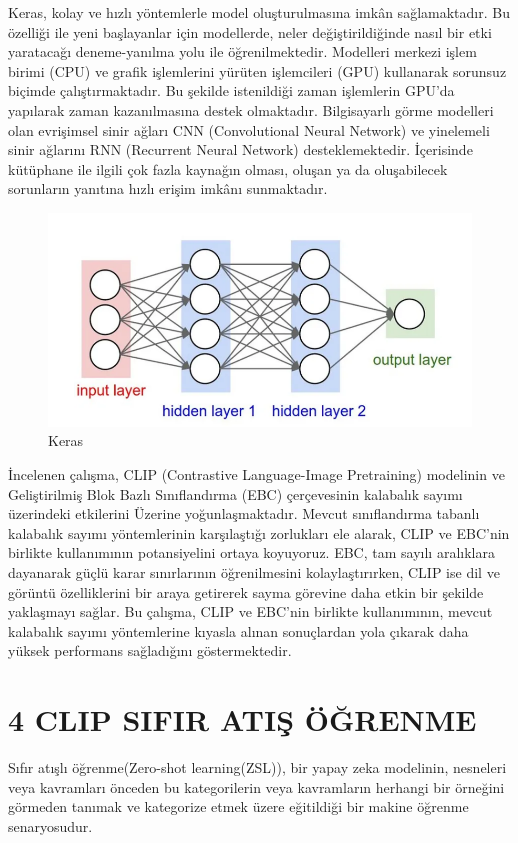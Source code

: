 \documentclass[10pt,a4paper]{report}
\begin{document}
	Keras, kolay ve hızlı yöntemlerle model oluşturulmasına imkân sağlamaktadır. Bu özelliği ile yeni başlayanlar için modellerde, neler değiştirildiğinde nasıl bir etki yaratacağı deneme-yanılma yolu ile öğrenilmektedir.
	Modelleri merkezi işlem birimi (CPU) ve grafik işlemlerini yürüten işlemcileri (GPU) kullanarak sorunsuz biçimde çalıştırmaktadır. Bu şekilde istenildiği zaman işlemlerin GPU’da yapılarak zaman kazanılmasına destek olmaktadır.
	Bilgisayarlı görme modelleri olan evrişimsel sinir ağları CNN (Convolutional Neural Network) ve yinelemeli sinir ağlarını RNN (Recurrent Neural Network) desteklemektedir.
	İçerisinde kütüphane ile ilgili çok fazla kaynağın olması, oluşan ya da oluşabilecek sorunların yanıtına hızlı erişim imkânı sunmaktadır.
	
	\begin{figure}[!h]
		\centering
		\includegraphics[width=\textwidth]{keras}
		\caption{ Keras \cite{allibhai}}
		\label{Keras}
	\end{figure}
	\clearpage
	İncelenen çalışma, CLIP (Contrastive Language-Image Pretraining) modelinin ve Geliştirilmiş Blok Bazlı Sınıflandırma (EBC) çerçevesinin kalabalık sayımı üzerindeki etkilerini Üzerine yoğunlaşmaktadır. Mevcut sınıflandırma tabanlı kalabalık sayımı yöntemlerinin karşılaştığı zorlukları ele alarak, CLIP ve EBC'nin birlikte kullanımının potansiyelini ortaya koyuyoruz. EBC, tam sayılı aralıklara dayanarak güçlü karar sınırlarının öğrenilmesini kolaylaştırırken, CLIP ise dil ve görüntü özelliklerini bir araya getirerek sayma görevine daha etkin bir şekilde yaklaşmayı sağlar. Bu çalışma, CLIP ve EBC'nin birlikte kullanımının, mevcut kalabalık sayımı yöntemlerine kıyasla alınan sonuçlardan yola çıkarak daha yüksek performans sağladığını göstermektedir.
		\section*{4 CLIP SIFIR ATIŞ ÖĞRENME }
	Sıfır atışlı öğrenme(Zero-shot learning(ZSL)), bir yapay zeka modelinin, nesneleri veya kavramları önceden bu kategorilerin veya kavramların herhangi bir örneğini görmeden tanımak ve kategorize etmek üzere eğitildiği bir makine öğrenme senaryosudur.	\newline
	
\end{document}
